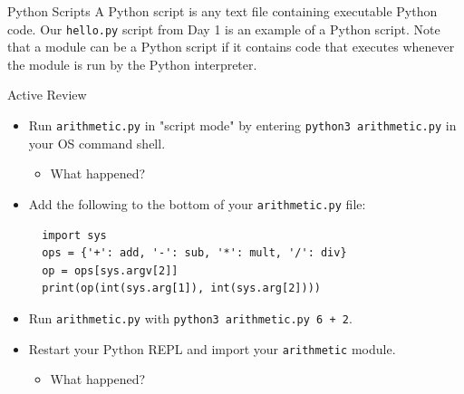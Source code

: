 \documentclass[smaller, aspectratio=1610]{beamer}
\begin{document}
\begin{frame}[label={sec:org212e087},fragile]{Python Scripts}
 A Python script is any text file containing executable Python code.  Our \texttt{hello.py} script from Day 1 is an example of a Python script.  Note that a module can be a Python script if it contains code that executes whenever the module is run by the Python interpreter.

\begin{block}{Active Review}
\begin{itemize}
\item Run \texttt{arithmetic.py} in "script mode" by entering \texttt{python3 arithmetic.py} in your OS command shell.
\begin{itemize}
\item What happened?
\end{itemize}
\item Add the following to the bottom of your \texttt{arithmetic.py} file:

\lstset{language=Python,label= ,caption= ,captionpos=b,numbers=none}
\begin{lstlisting}
  import sys
  ops = {'+': add, '-': sub, '*': mult, '/': div}
  op = ops[sys.argv[2]]
  print(op(int(sys.arg[1]), int(sys.arg[2])))
\end{lstlisting}

\item Run \texttt{arithmetic.py} with \texttt{python3 arithmetic.py 6 + 2}.
\item Restart your Python REPL and import your \texttt{arithmetic} module.
\begin{itemize}
\item What happened?
\end{itemize}
\end{itemize}
\end{block}
\end{frame}
\end{document}
